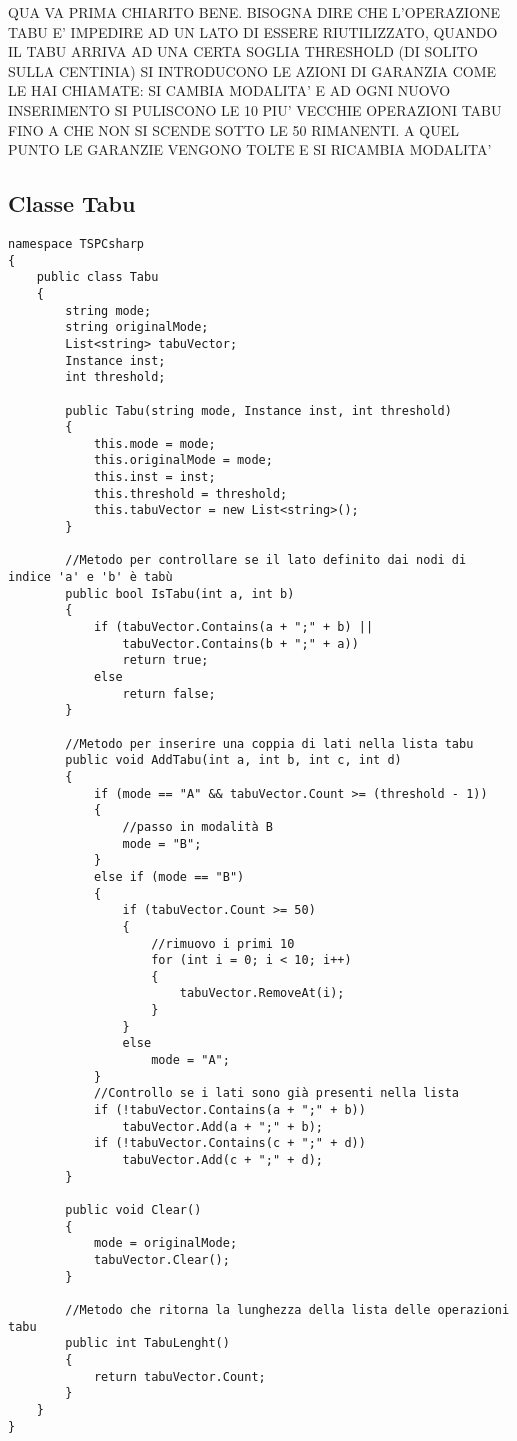 QUA VA PRIMA CHIARITO BENE. BISOGNA DIRE CHE L'OPERAZIONE TABU E' IMPEDIRE AD UN LATO DI ESSERE RIUTILIZZATO, QUANDO IL TABU ARRIVA AD UNA CERTA SOGLIA THRESHOLD (DI SOLITO SULLA CENTINIA) SI INTRODUCONO LE AZIONI DI GARANZIA COME LE HAI CHIAMATE: SI CAMBIA MODALITA' E AD OGNI NUOVO INSERIMENTO SI PULISCONO LE 10 PIU' VECCHIE OPERAZIONI TABU FINO A CHE NON SI SCENDE SOTTO LE 50 RIMANENTI. A QUEL PUNTO LE GARANZIE VENGONO TOLTE E SI RICAMBIA MODALITA'

\subsection{Classe Tabu}
\begin{lstlisting}
namespace TSPCsharp
{
    public class Tabu
    {
        string mode;
        string originalMode;
        List<string> tabuVector;
        Instance inst;
        int threshold;

        public Tabu(string mode, Instance inst, int threshold)
        {
            this.mode = mode;
            this.originalMode = mode;
            this.inst = inst;
            this.threshold = threshold;
            this.tabuVector = new List<string>();
        }

        //Metodo per controllare se il lato definito dai nodi di indice 'a' e 'b' è tabù
        public bool IsTabu(int a, int b)
        {
            if (tabuVector.Contains(a + ";" + b) ||
                tabuVector.Contains(b + ";" + a))
                return true;
            else
                return false;
        }
		
		//Metodo per inserire una coppia di lati nella lista tabu
        public void AddTabu(int a, int b, int c, int d)
        {
            if (mode == "A" && tabuVector.Count >= (threshold - 1))
            {
                //passo in modalità B
                mode = "B";
            }
            else if (mode == "B")
            {
                if (tabuVector.Count >= 50)
                {
                    //rimuovo i primi 10
                    for (int i = 0; i < 10; i++)
                    {
                        tabuVector.RemoveAt(i);
                    }
                }
                else
                    mode = "A";
            }
            //Controllo se i lati sono già presenti nella lista
            if (!tabuVector.Contains(a + ";" + b))
                tabuVector.Add(a + ";" + b);
            if (!tabuVector.Contains(c + ";" + d))
                tabuVector.Add(c + ";" + d);
        }

        public void Clear()
        {
            mode = originalMode;
            tabuVector.Clear();
        }
		
		//Metodo che ritorna la lunghezza della lista delle operazioni tabu
        public int TabuLenght()
        {
            return tabuVector.Count;
        }
    }
}
\end{lstlisting}

